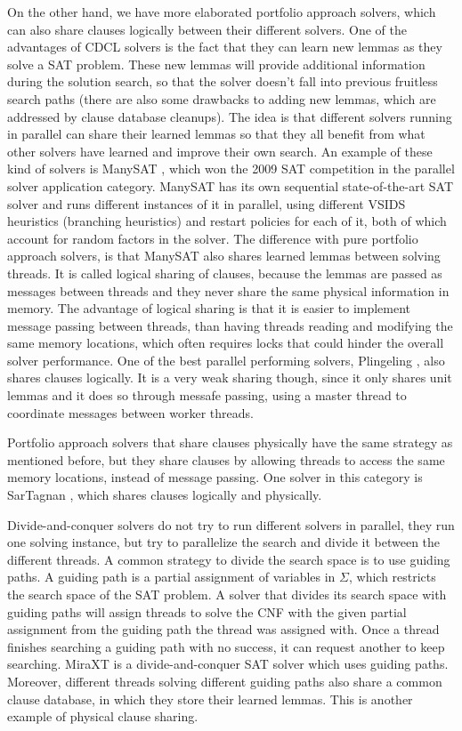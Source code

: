 \documentclass[12pt]{diicc}
\begin{document}
On the other hand, we have more elaborated portfolio approach solvers, which can also share clauses logically between their different solvers. One of the advantages of CDCL solvers is the fact that they can learn new lemmas as they solve a SAT problem. These new lemmas will provide additional information during the solution search, so that the solver doesn't fall into previous fruitless search paths (there are also some drawbacks to adding new lemmas, which are addressed by clause database cleanups). The idea is that different solvers running in parallel can share their learned lemmas so that they all benefit from what other solvers have learned and improve their own search. An example of these kind of solvers is ManySAT \cite{manysat}, which won the 2009 SAT competition in the parallel solver application category. ManySAT has its own sequential state-of-the-art SAT solver and runs different instances of it in parallel, using different VSIDS \cite{vsids} heuristics (branching heuristics) and restart policies for each of it, both of which account for random factors in the solver. The difference with pure portfolio approach solvers, is that ManySAT also shares learned lemmas between solving threads. It is called logical sharing of clauses, because the lemmas are passed as messages between threads and they never share the same physical information in memory. The advantage of logical sharing is that it is easier to implement message passing between threads, than having threads reading and modifying the same memory locations, which often requires locks that could hinder the overall solver performance. One of the best parallel performing solvers, Plingeling \cite{plingeling}, also shares clauses logically. It is a very weak sharing though, since it only shares unit lemmas and it does so through messafe passing, using a master thread to coordinate messages between worker threads. 

Portfolio approach solvers that share clauses physically have the same strategy as mentioned before, but they share clauses by allowing threads to access the same memory locations, instead of message passing. One solver in this category is SarTagnan \cite{sartagnan}, which shares clauses logically and physically. 

Divide-and-conquer solvers do not try to run different solvers in parallel, they run one solving instance, but try to parallelize the search and divide it between the different threads. A common strategy to divide the search space is to use guiding paths. A guiding path is a partial assignment of variables in $\Sigma$, which restricts the search space of the SAT problem. A solver that divides its search space with guiding paths will assign threads to solve the CNF with the given partial assignment from the guiding path the thread was assigned with. Once a thread finishes searching a guiding path with no success, it can request another to keep searching. MiraXT \cite{miraxt} is a divide-and-conquer SAT solver which uses guiding paths. Moreover, different threads solving different guiding paths also share a common clause database, in which they store their learned lemmas. This is another example of physical clause sharing. 
\end{document}
